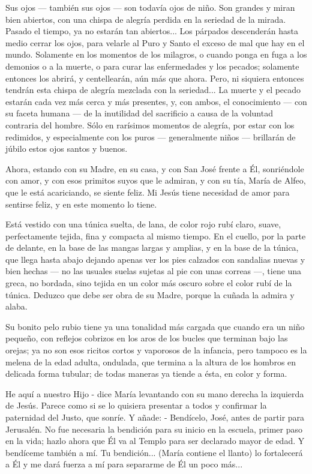 \documentclass[12pt, twoside, openright]{book} %
\begin{document}
Sus ojos — también sus ojos — son todavía ojos de niño. Son grandes y miran bien abiertos, con una chispa de alegría perdida en la seriedad de la mirada. Pasado el tiempo, ya no estarán tan abiertos... Los párpados descenderán hasta medio cerrar los ojos, para velarle al Puro y Santo el exceso de mal que hay en el mundo. Solamente en los momentos de los milagros, o cuando ponga en fuga a los demonios o a la muerte, o para curar las enfermedades y los pecados; solamente entonces los abrirá, y centellearán, aún más que ahora. Pero, ni siquiera entonces tendrán esta chispa de alegría mezclada con la seriedad... La muerte y el pecado estarán cada vez más cerca y más presentes, y, con ambos, el conocimiento — con su faceta humana — de la inutilidad del sacrificio a causa de la voluntad contraria del hombre. Sólo en rarísimos momentos de alegría, por estar con los redimidos, y especialmente con los puros — generalmente niños — brillarán de júbilo estos ojos santos y buenos. 

Ahora, estando con su Madre, en su casa, y con San José frente a Él, sonriéndole con amor, y con esos primitos suyos que le admiran, y con su tía, María de Alfeo, que le está acariciando, se siente feliz. Mi Jesús tiene necesidad de amor para sentirse feliz, y en este momento lo tiene. 

Está vestido con una túnica suelta, de lana, de color rojo rubí claro, suave, perfectamente tejida, fina y compacta al mismo tiempo. En el cuello, por la parte de delante, en la base de las mangas largas y amplias, y en la base de la túnica, que llega hasta abajo dejando apenas ver los pies calzados con sandalias nuevas y bien hechas — no las usuales suelas sujetas al pie con unas correas —, tiene una greca, no bordada, sino tejida en un color más oscuro sobre el color rubí de la túnica. Deduzco que debe ser obra de su Madre, porque la cuñada la admira y alaba. 

Su bonito pelo rubio tiene ya una tonalidad más cargada que cuando era un niño pequeño, con reflejos cobrizos en los aros de los bucles que terminan bajo las orejas; ya no son esos ricitos cortos y vaporosos de la infancia, pero tampoco es la melena de la edad adulta, ondulada, que termina a la altura de los hombros en delicada forma tubular; de todas maneras ya tiende a ésta, en color y forma. 

He aquí a nuestro Hijo - dice María levantando con su mano derecha la izquierda de Jesús. Parece como si se lo quisiera presentar a todos y confirmar la paternidad del Justo, que sonríe. Y añade: - Bendícelo, José, antes de partir para Jerusalén. No fue necesaria la bendición para su inicio en la escuela, primer paso en la vida; hazlo ahora que Él va al Templo para ser declarado mayor de edad. Y bendíceme también a mí. Tu bendición... (María contiene el llanto) lo fortalecerá a Él y me dará fuerza a mí para separarme de Él un poco más... 
\end{document}
